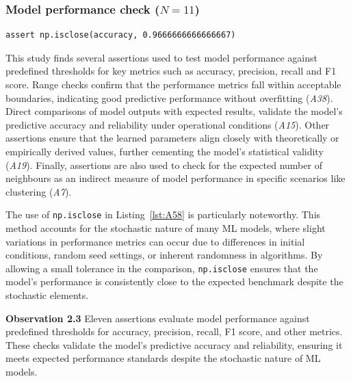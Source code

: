 \documentclass[smallextended]{svjour3}       %
\newcommand{\highlight}[1]{\begin{framed}%
  \noindent#1
\end{framed}}
\providecommand{\DIFaddbegin}{} %
\providecommand{\DIFaddend}{} %
\providecommand{\DIFdelbegin}{} %
\providecommand{\DIFdelend}{} %
\newcommand{\DIFscaledelfig}{0.5}
\newlength{\DIFdelgraphicswidth} %
\newlength{\DIFdelgraphicsheight} %
\newcommand{\DIFaddincludegraphics}[2][]{{\color{blue}\fbox{\DIFOincludegraphics[#1]{#2}}}} %
\newcommand{\DIFdelincludegraphics}[2][]{%
\sbox{\DIFdelgraphicsbox}{\DIFOincludegraphics[#1]{#2}}%
\settoboxwidth{\DIFdelgraphicswidth}{\DIFdelgraphicsbox} %
\settoboxtotalheight{\DIFdelgraphicsheight}{\DIFdelgraphicsbox} %
\scalebox{\DIFscaledelfig}{%
\parbox[b]{\DIFdelgraphicswidth}{\usebox{\DIFdelgraphicsbox}\\[-\baselineskip] \rule{\DIFdelgraphicswidth}{0em}}\llap{\resizebox{\DIFdelgraphicswidth}{\DIFdelgraphicsheight}{%
\setlength{\unitlength}{\DIFdelgraphicswidth}%
\begin{picture}(1,1)%
\thicklines\linethickness{2pt} %
{\color[rgb]{1,0,0}\put(0,0){\framebox(1,1){}}}%
{\color[rgb]{1,0,0}\put(0,0){\line( 1,1){1}}}%
{\color[rgb]{1,0,0}\put(0,1){\line(1,-1){1}}}%
\end{picture}%
}\hspace*{3pt}}} %
} %
\DeclareRobustCommand{\DIFaddbegin}{\DIFOaddbegin \let\includegraphics\DIFaddincludegraphics} %
\DeclareRobustCommand{\DIFaddend}{\DIFOaddend \let\includegraphics\DIFOincludegraphics} %
\DeclareRobustCommand{\DIFdelbegin}{\DIFOdelbegin \let\includegraphics\DIFdelincludegraphics} %
\DeclareRobustCommand{\DIFdelend}{\DIFOaddend \let\includegraphics\DIFOincludegraphics} %
\begin{document}
\subsubsection{Model performance check ($N = 11$)}\label{sec:assert-model-perf}

\begin{lstlisting}[caption={Assertion \emph{A58} used to check that the accuracy of a model is close to the specified value. The use of \lstinline{np.isclose} allows for small deviations in the accuracy thus accounting for the stochastic nature of ML models.}, label={lst:A58}]
assert np.isclose(accuracy, 0.9666666666666667)
\end{lstlisting}

This study finds several assertions used to test model performance against predefined thresholds for key metrics such as accuracy, precision, recall and F1 score. Range checks confirm that the performance metrics fall within acceptable boundaries, indicating good predictive performance without overfitting (\emph{A38}). Direct comparisons of model outputs with expected results, validate the model's predictive accuracy and reliability under operational conditions (\emph{A15}). Other assertions ensure that the learned parameters align closely with theoretically or empirically derived values, further cementing the model’s statistical validity (\emph{A19}). Finally, assertions are also used to check for the expected number of neighbours as an indirect measure of model performance in specific scenarios like clustering (\emph{A7}).

The use of \lstinline{np.isclose} in Listing~\ref{lst:A58} is particularly noteworthy. This method accounts for the stochastic nature of many ML models, where slight variations in performance metrics can occur due to differences in initial conditions, random seed settings, or inherent randomness in algorithms. By allowing a small tolerance in the comparison, \lstinline{np.isclose} ensures that the model's performance is consistently close to the expected benchmark despite the stochastic elements.

\DIFdelbegin %
\DIFdelend \DIFaddbegin \highlight{\textbf{Observation 2.3} Eleven assertions evaluate model performance against predefined thresholds for accuracy, precision, recall, F1 score, and other metrics. These checks validate the model's predictive accuracy and reliability, ensuring it meets expected performance standards despite the stochastic nature of ML models.}
\DIFaddend 
\end{document}

